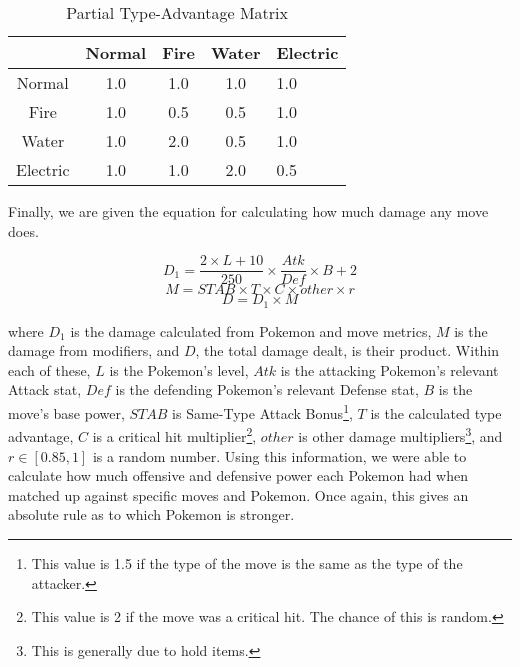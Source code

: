 \documentclass{acm_proc_article-sp}
\begin{document}
\begin{table}

\centering

\caption{Partial Type-Advantage Matrix}

\begin{tabular}{|c|c|c|c|l|} \hline

  & Normal & Fire & Water & Electric \\ \hline

Normal & 1.0 & 1.0 & 1.0 & 1.0 \\ \hline

Fire & 1.0 & 0.5 & 0.5 & 1.0 \\ \hline

Water & 1.0 & 2.0 & 0.5 & 1.0 \\ \hline

Electric & 1.0 & 1.0 & 2.0 & 0.5 \\ \hline

\end{tabular}

\end{table}

Finally, we are given the equation for calculating how much damage any move does.

\begin{equation}D_1 = \frac{2 \times L + 10}{250} \times \frac{Atk}{Def} \times B + 2 \end{equation}
\begin{equation}M = STAB \times T \times C \times other \times r
\end{equation}
\begin{equation}D = D_1 \times M
\end{equation}

where $D_1$ is the damage calculated from Pokemon and move metrics, $M$ is the damage from modifiers, and $D$, the total damage dealt, is their product. Within each of these, $L$ is the Pokemon's level, $Atk$ is the attacking Pokemon's relevant Attack stat, $Def$ is the defending Pokemon's relevant Defense stat, $B$ is the move's base power, $STAB$ is Same-Type Attack Bonus\footnote{This value is 1.5 if the type of the move is the same as the type of the attacker.}, $T$ is the calculated type advantage, $C$ is a critical hit multiplier\footnote{This value is 2 if the move was a critical hit. The chance of this is random.}, $other$ is other damage multipliers\footnote{This is generally due to hold items.}, and $r\in[0.85, 1]$ is a random number. Using this information, we were able to calculate how much offensive and defensive power each Pokemon had when matched up against specific moves and Pokemon. Once again, this gives an absolute rule as to which Pokemon is stronger.
\end{document}
